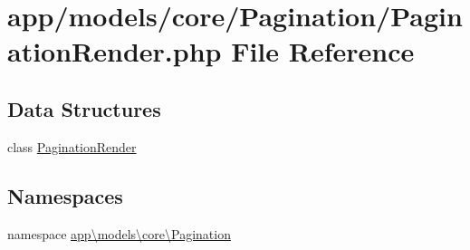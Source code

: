 \hypertarget{_pagination_render_8php}{\section{app/models/core/\-Pagination/\-Pagination\-Render.php File Reference}
\label{_pagination_render_8php}
}
\subsection*{Data Structures}
\begin{DoxyCompactItemize}
\item 
class \hyperlink{classapp_1_1models_1_1core_1_1_pagination_1_1_pagination_render}{Pagination\-Render}
\end{DoxyCompactItemize}
\subsection*{Namespaces}
\begin{DoxyCompactItemize}
\item 
namespace \hyperlink{namespaceapp_1_1models_1_1core_1_1_pagination}{app\textbackslash{}models\textbackslash{}core\textbackslash{}\-Pagination}
\end{DoxyCompactItemize}
